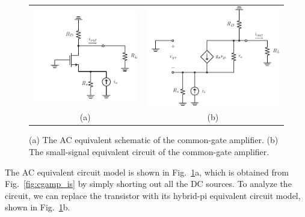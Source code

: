 \begin{figure}[tb]
\begin{center}
\begin{tabular}{cc}
\includegraphics[scale=.9]{cgamp_is_ac} &
\includegraphics[scale=.9]{cgamp_is_ac_ss} \\
(a) & (b) \\
\end{tabular}
\end{center}
\caption{(a) The AC equivalent schematic of the common-gate amplifier.  (b) The small-signal equivalent circuit of the common-gate amplifier.} \label{fig:cgamp_is_ac}
\end{figure}

The AC equivalent circuit model is shown in Fig.~\ref{fig:cgamp_is_ac}a, which is obtained from Fig.~\ref{fig:cgamp_is} by simply shorting out all the DC sources.  To analyze the circuit, we can replace the transistor with its hybrid-pi equivalent circuit model, shown in Fig.~\ref{fig:cgamp_is_ac}b.



